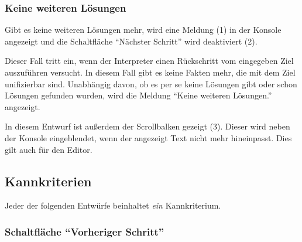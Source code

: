 \documentclass[parskip=full,11pt,twoside]{scrartcl}
\begin{document}
\subsubsection{Keine weiteren Lösungen}

\begin{minipage}{\linewidth}
\end{minipage}

Gibt es keine weiteren Lösungen mehr, wird eine Meldung (1) in der Konsole angezeigt und die Schaltfläche \enquote{Nächster Schritt} wird deaktiviert (2).

Dieser Fall tritt ein, wenn der Interpreter einen Rückschritt vom eingegeben Ziel auszuführen versucht.
In diesem Fall gibt es keine Fakten mehr, die mit dem Ziel unifizierbar sind.
Unabhängig davon, ob es per se keine Lösungen gibt oder schon Lösungen gefunden wurden, wird die Meldung \enquote{Keine weiteren Lösungen.} angezeigt.

In diesem Entwurf ist außerdem der Scrollbalken gezeigt (3).
Dieser wird neben der Konsole eingeblendet, wenn der angezeigt Text nicht mehr hineinpasst.
Dies gilt auch für den Editor.

\subsection{Kannkriterien}

Jeder der folgenden Entwürfe beinhaltet \emph{ein} Kannkriterium.

\subsubsection{Schaltfläche \enquote{Vorheriger Schritt}}

\begin{minipage}{\linewidth}
\end{minipage}

\begin{minipage}{\linewidth}
\end{minipage}
\end{document}
